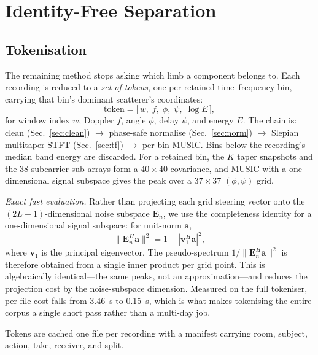 \documentclass[conference]{IEEEtran}
\begin{document}
\section{Identity-Free Separation}
\label{sec:sep}

\subsection{Tokenisation}
\label{sec:token}

The remaining method stops asking which limb a component belongs to. Each
recording is reduced to a \emph{set of tokens}, one per retained
time--frequency bin, carrying that bin's dominant scatterer's coordinates:
\begin{equation}
\text{token} = \big[\,w,\; f,\; \phi,\; \psi,\; \log E\,\big],
\end{equation}
for window index $w$, Doppler $f$, angle $\phi$, delay $\psi$, and energy $E$.
The chain is: clean (Sec.~\ref{sec:clean}) $\rightarrow$ phase-safe normalise
(Sec.~\ref{sec:norm}) $\rightarrow$ Slepian multitaper STFT
(Sec.~\ref{sec:tf}) $\rightarrow$ per-bin MUSIC. Bins below the recording's
median band energy are discarded. For a retained bin, the $K$ taper snapshots
and the $38$ subcarrier sub-arrays form a $40 \times 40$ covariance, and MUSIC
with a one-dimensional signal subspace gives the peak over a $37 \times 37$
$(\phi, \psi)$ grid.

\emph{Exact fast evaluation.} Rather than projecting each grid steering vector
onto the $(2L-1)$-dimensional noise subspace $\mathbf{E}_n$, we use the
completeness identity for a one-dimensional signal subspace: for unit-norm
$\mathbf{a}$,
\begin{equation}
\|\mathbf{E}_n^{H}\mathbf{a}\|^2 = 1 - |\mathbf{v}_1^{H}\mathbf{a}|^2,
\label{eq:completeness}
\end{equation}
where $\mathbf{v}_1$ is the principal eigenvector. The pseudo-spectrum
$1/\|\mathbf{E}_n^{H}\mathbf{a}\|^2$ is therefore obtained from a single
inner product per grid point. This is algebraically identical---the same
peaks, not an approximation---and reduces the projection cost by the
noise-subspace dimension. Measured on the full tokeniser, per-file cost falls
from \SI{3.46}{\second} to \SI{0.15}{\second}, which is what makes tokenising
the entire corpus a single short pass rather than a multi-day job.

Tokens are cached one file per recording with a manifest carrying room,
subject, action, take, receiver, and split.
\end{document}
